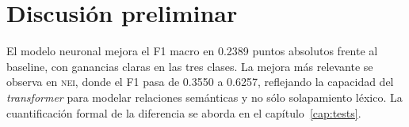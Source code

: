 \section{Discusión preliminar}

El modelo neuronal mejora el F1 macro en 0.2389 puntos absolutos frente
al baseline, con ganancias claras en las tres clases. La mejora más
relevante se observa en \textsc{nei}, donde el F1 pasa de 0.3550 a
0.6257, reflejando la capacidad del \emph{transformer} para modelar
relaciones semánticas y no sólo solapamiento léxico. La cuantificación
formal de la diferencia se aborda en el capítulo~\ref{cap:tests}.
